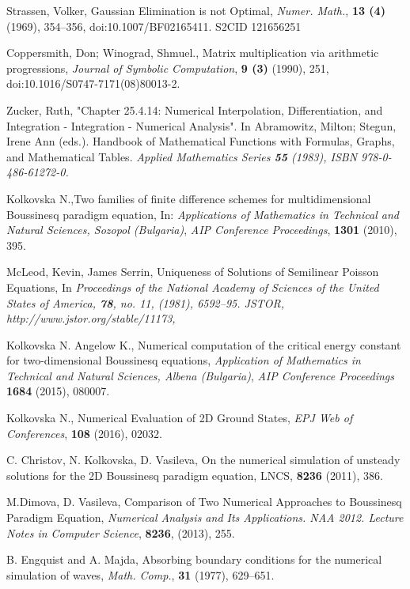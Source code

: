 \documentclass[a4paper]{article}
\theoremstyle{remark}
\begin{document}
\begin{thebibliography}{99}
Strassen, Volker, Gaussian Elimination is not Optimal,
{\it Numer. Math.}, \textbf{13 (4)} (1969), 354–356, doi:10.1007/BF02165411. S2CID 121656251

 Coppersmith, Don; Winograd, Shmuel., Matrix multiplication via arithmetic progressions,
{\it  Journal of Symbolic Computation}, \textbf{9 (3)} (1990), 251, doi:10.1016/S0747-7171(08)80013-2.

Zucker, Ruth, "Chapter 25.4.14: Numerical Interpolation, Differentiation, and Integration - Integration - Numerical Analysis". In Abramowitz, Milton; Stegun, Irene Ann (eds.). Handbook of Mathematical Functions with Formulas, Graphs, and Mathematical Tables. 
\it{Applied Mathematics Series} \textbf{55}  (1983), ISBN 978-0-486-61272-0.

 Kolkovska N.,Two families of finite difference schemes for multidimensional Boussinesq paradigm equation, In:
{\it Applications of Mathematics in Technical and Natural Sciences,  Sozopol (Bulgaria)},
\emph{AIP Conference Proceedings}, \textbf{1301} (2010), 395.

 McLeod, Kevin, James Serrin, Uniqueness of Solutions of Semilinear Poisson Equations, In \it{Proceedings of the National Academy of Sciences of the United States of America}, \textbf{78}, no. 11, (1981), 6592–95. JSTOR, http://www.jstor.org/stable/11173,

 Kolkovska N. Angelow K., Numerical computation of the critical energy constant for two-dimensional Boussinesq equations,
{\it Application of Mathematics in Technical and Natural Sciences, Albena (Bulgaria)},
\emph{AIP Conference Proceedings}  \textbf{1684} (2015), 080007.

 Kolkovska N., Numerical Evaluation of 2D Ground States,
\emph{ EPJ Web of Conferences}, \textbf{108} (2016), 02032.

C. Christov, N. Kolkovska, D. Vasileva, On the numerical simulation of unsteady solutions for the 2D Boussinesq paradigm equation, LNCS, \textbf{8236}  (2011), 386.

M.Dimova, D. Vasileva, Comparison of Two Numerical Approaches to Boussinesq Paradigm Equation, 
{\it Numerical Analysis and Its Applications. NAA 2012. Lecture Notes in Computer Science}, \textbf{8236}, (2013), 255.

 B. Engquist and A. Majda, Absorbing boundary conditions for the numerical simulation of waves, {\it Math. Comp.}, \textbf{31} (1977), 629–651.


\end{thebibliography}
\end{document}
